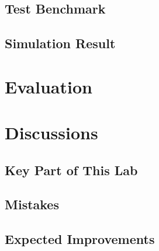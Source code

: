 \documentclass{report}
\begin{document}
        \section{Test Benchmark}
        \section{Simulation Result}
    \chapter{Evaluation}

    \chapter{Discussions}
        \section{Key Part of This Lab}
        \section{Mistakes}
        \section{Expected Improvements}
\end{document}
